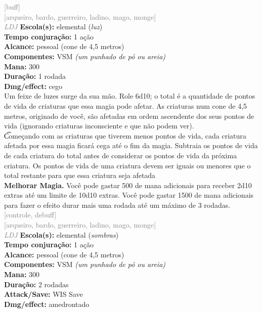 \documentclass{RPG_Adventure}[2021/10/20]
\begin{document}
{\scriptsize \textcolor{gray}{[buff]\\}}
{\scriptsize \textcolor{gray}{[arqueiro, bardo, guerreiro, ladino, mago, monge]\\}}
{\tiny \textcolor{gray}{\textit{LDJ}}}\jump{}
{\small \t \textbf{Escola(s):} elemental (\textit{luz})\\\t \textbf{Tempo conjuração:} 1 ação\\\t \textbf{Alcance:} pessoal (cone de 4,5 metros)\\\t \textbf{Componentes:} VSM \textit{(um punhado de pó ou areia)}\\\t \textbf{Mana:} 300\\\t \textbf{Duração:} 1 rodada\\\t \textbf{Dmg/effect:} cego\\}
{\normalsize Um feixe de luzes surge da sua mão. Role 6d10; o total é a quantidade de pontos de vida de criaturas que essa magia pode afetar. As criaturas num cone de 4,5 metros, originado de você, são afetadas em ordem ascendente dos seus pontos de vida (ignorando criaturas inconsciente e que não podem ver).\\\t Começando com as criaturas que tiverem menos pontos de vida, cada criatura afetada por essa magia ficará cega até o fim da magia. Subtraia os pontos de vida de cada criatura do total antes de considerar os pontos de vida da próxima criatura. Os pontos de vida de uma criatura devem ser iguais ou menores que o total restante para que essa criatura seja afetada\\\t \textbf{Melhorar Magia.} Você pode gastar 500 de mana adicionais para receber 2d10 extras até um limite de 10d10 extras. Você pode gastar 1500 de mana adicionais para fazer o efeito durar mais uma rodada até um máximo de 3 rodadas.\\}
{\scriptsize \textcolor{gray}{[controle, debuff]\\}}
{\scriptsize \textcolor{gray}{[arqueiro, bardo, guerreiro, ladino, mago, monge]\\}}
{\tiny \textcolor{gray}{\textit{LDJ}}}\jump{}
{\small \t \textbf{Escola(s):} elemental (\textit{sombras})\\\t \textbf{Tempo conjuração:} 1 ação\\\t \textbf{Alcance:} pessoal (cone de 4,5 metros)\\\t \textbf{Componentes:} VSM \textit{(um punhado de pó ou areia)}\\\t \textbf{Mana:} 300\\\t \textbf{Duração:} 2 rodadas\\\t \textbf{Attack/Save:} WIS Save\\\t \textbf{Dmg/effect:} amedrontado\\}
\end{document}
